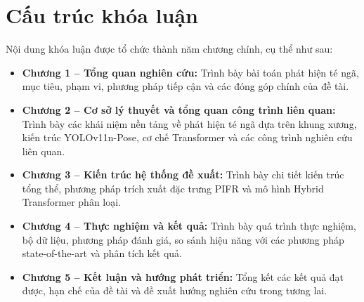 \section{Cấu trúc khóa luận}
\label{sec:cau_truc_khoa_luan}

Nội dung khóa luận được tổ chức thành năm chương chính, cụ thể như sau:

\begin{itemize}
    \item \textbf{Chương 1 -- Tổng quan nghiên cứu:} Trình bày bài toán phát hiện té ngã, mục tiêu, phạm vi, phương pháp tiếp cận và các đóng góp chính của đề tài.
    
    \item \textbf{Chương 2 -- Cơ sở lý thuyết và tổng quan công trình liên quan:} Trình bày các khái niệm nền tảng về phát hiện té ngã dựa trên khung xương, kiến trúc YOLOv11n-Pose, cơ chế Transformer và các công trình nghiên cứu liên quan.
    
    \item \textbf{Chương 3 -- Kiến trúc hệ thống đề xuất:} Trình bày chi tiết kiến trúc tổng thể, phương pháp trích xuất đặc trưng PIFR và mô hình Hybrid Transformer phân loại.
    
    \item \textbf{Chương 4 -- Thực nghiệm và kết quả:} Trình bày quá trình thực nghiệm, bộ dữ liệu, phương pháp đánh giá, so sánh hiệu năng với các phương pháp state-of-the-art và phân tích kết quả.
    
    \item \textbf{Chương 5 -- Kết luận và hướng phát triển:} Tổng kết các kết quả đạt được, hạn chế của đề tài và đề xuất hướng nghiên cứu trong tương lai.
\end{itemize}
